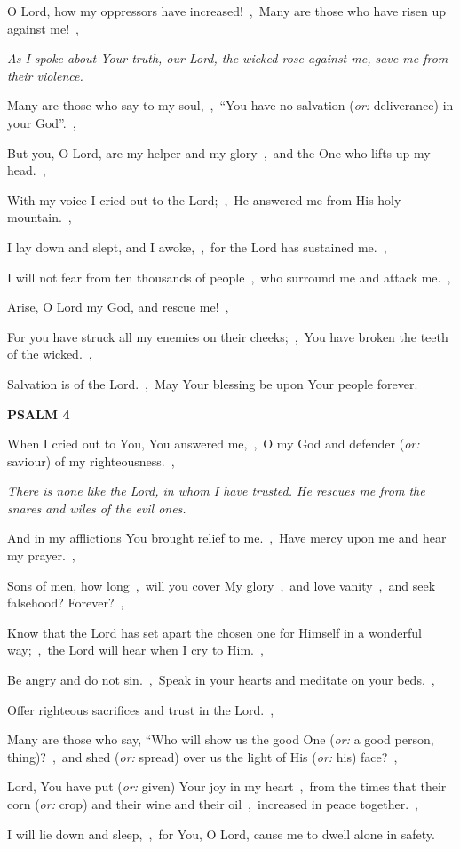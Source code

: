 \documentclass[12pt,twoside,a5paper]{article}
\newcommand{\psalm}[1]{\textbf{PSALM {#1}}\nopagebreak}
\newcommand{\qanona}[1]{{\liturgicalhint{Qanona.} \emph{#1}}}
\newcommand{\translationoption}[1]{\emph{or:} #1}
\begin{document}
\begin{normalparskip}
  O Lord, how my oppressors have increased!~\sep\ Many are those who have risen up against me!~\sep

  \qanona{As I spoke about Your truth, our Lord, the wicked rose against me, save me from their violence.}

  Many are those who say to my soul,~\sep\ ``You have no salvation (\translationoption{deliverance}) in your God''.~\sep

  But you, O Lord, are my helper and my glory~\sep\ and the One who lifts up my head.~\sep

  With my voice I cried out to the Lord;~\sep\ He answered me from His holy mountain.~\sep

  I lay down and slept, and I awoke,~\sep\ for the Lord has sustained me.~\sep

  I will not fear from ten thousands of people~\sep\ who surround me and attack me.~\sep

  Arise, O Lord my God, and rescue me!~\sep

  For you have struck all my enemies on their cheeks;~\sep\ You have broken the teeth of the wicked.~\sep

  Salvation is of the Lord.~\sep\ May Your blessing be upon Your people forever.
\end{normalparskip}

\psalm{4}

\begin{normalparskip}
  When I cried out to You, You answered me,~\sep\ O my God and defender (\translationoption{saviour}) of my righteousness.~\sep

  \qanona{There is none like the Lord, in whom I have trusted. He rescues me from the snares and wiles of the evil ones.}

  And in my afflictions You brought relief to me.~\sep\ Have mercy upon me and hear my prayer.~\sep

  Sons of men, how long~\sep\ will you cover My glory~\sep\ and love vanity~\sep\ and seek falsehood? Forever?~\sep

  Know that the Lord has set apart the chosen one for Himself in a wonderful way;~\sep\ the Lord will hear when I cry to Him.~\sep

  Be angry and do not sin.~\sep\ Speak in your hearts and meditate on your beds.~\sep

  Offer righteous sacrifices and trust in the Lord.~\sep

  Many are those who say, ``Who will show us the good One (\translationoption{a good person, thing})?~\sep\ and shed (\translationoption{spread}) over us the light of His (\translationoption{his}) face?~\sep

  Lord, You have put (\translationoption{given}) Your joy in my heart~\sep\ from the times that their corn (\translationoption{crop}) and their wine and their oil~\sep\ increased in peace together.~\sep

  I will lie down and sleep,~\sep\ for You, O Lord, cause me to dwell alone in safety.
\end{normalparskip}
\end{document}
